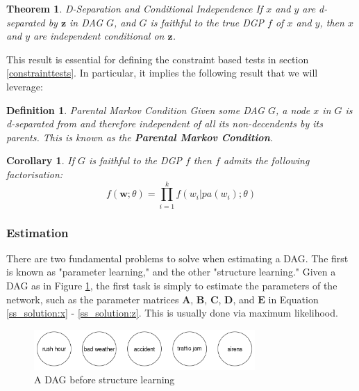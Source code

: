 \documentclass{article}
\newtheorem{definition}{Definition}
\newtheorem{corollary}{Corollary}
\newtheorem{theorem}{Theorem}
\begin{document}
\theoremstyle{theorem}
\begin{theorem}{D-Separation and Conditional Independence}
  If $x$ and $y$ are d-separated by $\mathbf{z}$ in DAG $G$, and $G$ is faithful to the true DGP $f$ of $x$ and $y$, then $x$ and $y$ are independent conditional on $\mathbf{z}$. 
  \parencite[p.16]{pearl2009causality}
  \label{dseptheorem}
\end{theorem}

This result is essential for defining the constraint based tests in section \ref{constrainttests}. In particular, it implies the following result that we will leverage:

\theoremstyle{corollary}
\begin{definition}{Parental Markov Condition}
  Given some DAG $G$, a node $x$ in $G$ is d-separated from and therefore independent of all its non-decendents by its parents. This is known as the \textbf{Parental Markov Condition}. 
  \parencite[p.16, p.19]{pearl2009causality}
  \label{markovcompatibility}
\end{definition}

\theoremstyle{corollary}
\begin{corollary}
  If $G$ is faithful to the DGP $f$ then $f$ admits the following factorisation:
  \begin{equation}
    f(\mathbf{w};\theta) = \prod_{i=1}^{k} f(w_i | pa(w_i);\theta)
  \end{equation}
\end{corollary}

\subsubsection{Estimation} \label{dag_estimation}

There are two fundamental problems to solve when estimating a DAG. The first is known as "parameter learning," and the other "structure learning." Given a DAG as in Figure \ref{dag2}, the first task is simply to estimate the parameters of the network, such as the parameter matrices $\mathbf{A}$, $\mathbf{B}$, $\mathbf{C}$, $\mathbf{D}$, and $\mathbf{E}$ in Equation \ref{ss_solution:x} - \ref{ss_solution:z}. This is usually done via maximum likelihood.

\begin{figure}
  \centering
  \includegraphics[width=0.75\textwidth]{images/trafficjam_unfit.png}
  \caption{A DAG before structure learning}
  \label{dag2}
\end{figure}
\end{document}

